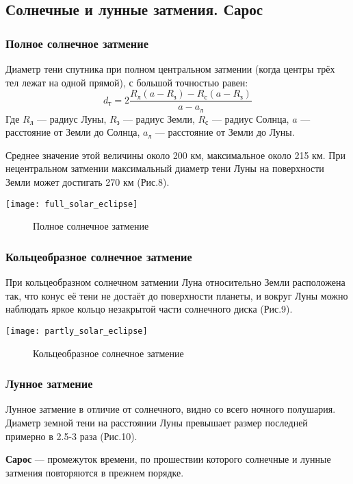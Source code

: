 \subsection{Солнечные и лунные затмения. Сарос}
\subsubsection{Полное солнечное затмение}
Диаметр тени спутника при полном центральном затмении (когда центры трёх тел лежат на одной прямой), с большой точностью равен:
$$d_\text{т}=2\frac{R_\text{л}(a-R_\text{з})-R_\text{с}(a-R_\text{з})}{a-a_\text{л}}$$
Где $R_\text{л}$ --- радиус Луны, $R_\text{з}$ --- радиус Земли, $R_\text{с}$ --- радиус Солнца, $a$ --- расстояние от Земли до Солнца, $a_\text{л}$ --- расстояние от Земли до Луны.

Среднее значение  этой величины около 200 км, максимальное около 215 км. При нецентральном затмении максимальный диаметр тени Луны на поверхности Земли может достигать 270 км (Рис.8).
\begin{center}
\texttt{[image: full\_solar\_eclipse]}
\begin{figure}[h!]
\caption{Полное солнечное затмение}
\end{figure}
\end{center}
\subsubsection{Кольцеобразное солнечное затмение}
При кольцеобразном солнечном затмении Луна относительно Земли расположена так, что конус её тени не достаёт до поверхности планеты, и вокруг Луны можно наблюдать яркое кольцо незакрытой части солнечного диска (Рис.9).
\begin{center}
\texttt{[image: partly\_solar\_eclipse]}
\begin{figure}[h!]
\caption{Кольцеобразное солнечное затмение}
\end{figure}
\end{center}
\subsubsection{Лунное затмение}

Лунное затмение в отличие от солнечного, видно со всего ночного полушария. Диаметр земной тени на расстоянии Луны превышает размер последней примерно в 2.5-3 раза (Рис.10).

\textbf{Сарос} --- промежуток  времени, по прошествии которого солнечные и лунные затмения повторяются в прежнем порядке.

